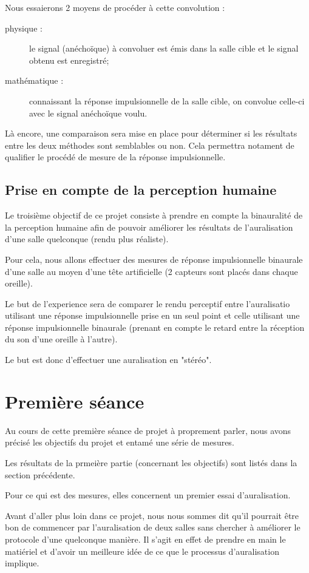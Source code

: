 \documentclass[12pt]{article}
\begin{document}
Nous essaierons 2 moyens de procéder à cette convolution :
\begin{description}
	\item[physique :] le signal (anéchoïque) à convoluer est émis dans la salle cible et le signal obtenu est enregistré;
    \item[mathématique :] connaissant la réponse impulsionnelle de la salle cible, on convolue celle-ci avec le signal anéchoïque voulu.
\end{description}

Là encore, une comparaison sera mise en place pour déterminer si les résultats entre les deux méthodes sont semblables ou non. Cela permettra notament de qualifier le procédé de mesure de la réponse impulsionnelle.


\subsection{Prise en compte de la perception humaine}
Le troisième objectif de ce projet consiste à prendre en compte la binauralité de la perception humaine afin de pouvoir améliorer les résultats de l'auralisation d'une salle quelconque (rendu plus réaliste).

Pour cela, nous allons effectuer des mesures de réponse impulsionnelle binaurale d'une salle au moyen d'une tête artificielle (2 capteurs sont placés dans chaque oreille).

Le but de l'experience sera de comparer le rendu perceptif entre l'auralisatio utilisant une réponse impulsionnelle prise en un seul point et celle utilisant une réponse impulsionnelle binaurale (prenant en compte le retard entre la réception du son d'une oreille à l'autre).

Le but est donc d'effectuer une auralisation en "stéréo".
\section{Première séance} %

Au cours de cette première séance de projet à proprement parler, nous avons précisé les objectifs du projet et entamé une série de mesures.

Les résultats de la prmeière partie (concernant les objectifs) sont listés dans la section précédente.

Pour ce qui est des mesures, elles concernent un premier essai d'auralisation.

Avant d'aller plus loin dans ce projet, nous nous sommes dit qu'il pourrait être bon de commencer par l'auralisation de deux salles sans chercher à améliorer le protocole d'une quelconque manière. Il s'agit en effet de prendre en main le matiériel et d'avoir un meilleure idée de ce que le processus d'auralisation implique.
\end{document}
